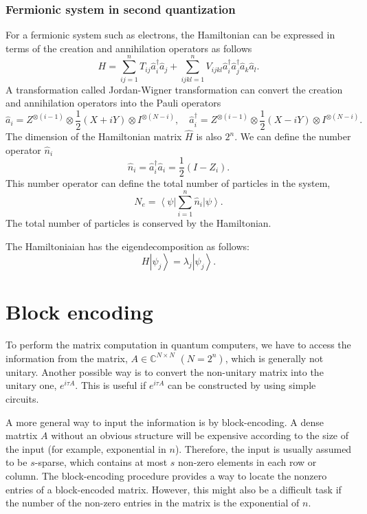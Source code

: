 \documentclass[11pt]{article}
\newcommand{\bra}[1]{\left\langle #1\right|}
\newcommand{\ket}[1]{\left|#1\right\rangle}
\begin{document}
\subsubsection*{Fermionic system in second quantization}
For a fermionic system such as electrons, the Hamiltonian can be expressed in terms of the creation and annihilation operators as follows
\begin{equation}
    H = \sum_{ij=1}^{n}T_{ij}\hat{a}_i^{\dagger}\hat{a}_j + \sum_{ijkl=1}^{n}V_{ijkl}\hat{a}_i^{\dagger}\hat{a}_j^{\dagger}\hat{a}_k\hat{a}_l.
\end{equation}
A transformation called Jordan-Wigner transformation can convert the creation and annihilation operators into the Pauli operators 
\begin{equation}
    \hat{a}_i = Z^{\otimes(i-1)}\otimes\frac{1}{2}(X + iY)\otimes I^{\otimes(N-i)}, \quad \hat{a}_i^{\dagger} = Z^{\otimes(i-1)}\otimes\frac{1}{2}(X - iY)\otimes I^{\otimes(N-i)}.
\end{equation}
The dimension of the Hamiltonian matrix $\hat{H}$ is also $2^n$. We can define the number operator $\hat{n}_i$
\begin{equation}
    \hat{n}_i = \hat{a}_i^{\dagger}\hat{a}_i = \frac{1}{2}(I - Z_i).
\end{equation}
This number operator can define the total number of particles in the system, 
\begin{equation}
    N_e = \bra{\psi}\sum_{i=1}^{n}\hat{n}_i\ket{\psi}.
\end{equation}
The total number of particles is conserved by the Hamiltonian. 

The Hamiltoniaian has the eigendecomposition as follows: 
\begin{equation}
    H\ket{\psi_j} = \lambda_j\ket{\psi_j}.
\end{equation}

\section{Block encoding}
To perform the matrix computation in quantum computers, we have to access the information from the matrix, $A \in \mathbb{C}^{N\times N}$ $(N = 2^n)$, which is generally not unitary. Another possible way is to convert the non-unitary matrix into the unitary one, $e^{i\tau A}$. This is useful if $e^{i\tau A}$ can be constructed by using simple circuits. 

A more general way to input the information is by block-encoding. A dense matrtix $A$ without an obvious structure will  be expensive according to the size of the input (for example, exponential in $n$). Therefore, the input is usually assumed to be $s$-sparse, which contains at most $s$ non-zero elements in each row or column. The block-encoding procedure provides a way to locate the nonzero entries of a block-encoded matrix. However, this might also be a difficult task if the number of the non-zero entries in the matrix is the exponential of $n$. 
\end{document}
